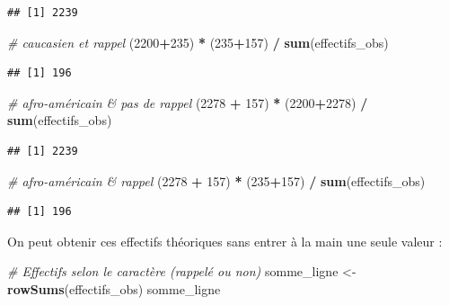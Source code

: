 \documentclass[
  11pt,
]{book}
\newenvironment{Shaded}{\begin{snugshade}}{\end{snugshade}}
\newcommand{\CommentTok}[1]{\textcolor[rgb]{0.56,0.35,0.01}{\textit{#1}}}
\newcommand{\DecValTok}[1]{\textcolor[rgb]{0.00,0.00,0.81}{#1}}
\newcommand{\FunctionTok}[1]{\textcolor[rgb]{0.13,0.29,0.53}{\textbf{#1}}}
\newcommand{\NormalTok}[1]{#1}
\newcommand{\OtherTok}[1]{\textcolor[rgb]{0.56,0.35,0.01}{#1}}
\newcommand{\SpecialCharTok}[1]{\textcolor[rgb]{0.81,0.36,0.00}{\textbf{#1}}}
\numberwithin{equation}{section}
\numberwithin{countremarque}{section}
\begin{document}
\begin{lstlisting}
## [1] 2239
\end{lstlisting}

\begin{Shaded}
\begin{Highlighting}[]
\CommentTok{\# caucasien et rappel}
\NormalTok{(}\DecValTok{2200}\SpecialCharTok{+}\DecValTok{235}\NormalTok{) }\SpecialCharTok{*}\NormalTok{ (}\DecValTok{235}\SpecialCharTok{+}\DecValTok{157}\NormalTok{) }\SpecialCharTok{/} \FunctionTok{sum}\NormalTok{(effectifs\_obs)}
\end{Highlighting}
\end{Shaded}

\begin{lstlisting}
## [1] 196
\end{lstlisting}

\begin{Shaded}
\begin{Highlighting}[]
\CommentTok{\# afro{-}américain \& pas de rappel}
\NormalTok{(}\DecValTok{2278} \SpecialCharTok{+} \DecValTok{157}\NormalTok{) }\SpecialCharTok{*}\NormalTok{ (}\DecValTok{2200}\SpecialCharTok{+}\DecValTok{2278}\NormalTok{) }\SpecialCharTok{/} \FunctionTok{sum}\NormalTok{(effectifs\_obs)}
\end{Highlighting}
\end{Shaded}

\begin{lstlisting}
## [1] 2239
\end{lstlisting}

\begin{Shaded}
\begin{Highlighting}[]
\CommentTok{\# afro{-}américain \& rappel}
\NormalTok{(}\DecValTok{2278} \SpecialCharTok{+} \DecValTok{157}\NormalTok{) }\SpecialCharTok{*}\NormalTok{ (}\DecValTok{235}\SpecialCharTok{+}\DecValTok{157}\NormalTok{) }\SpecialCharTok{/} \FunctionTok{sum}\NormalTok{(effectifs\_obs)}
\end{Highlighting}
\end{Shaded}

\begin{lstlisting}
## [1] 196
\end{lstlisting}

On peut obtenir ces effectifs théoriques sans entrer à la main une seule valeur :

\begin{Shaded}
\begin{Highlighting}[]
\CommentTok{\# Effectifs selon le caractère (rappelé ou non)}
\NormalTok{somme\_ligne }\OtherTok{\textless{}{-}} \FunctionTok{rowSums}\NormalTok{(effectifs\_obs)}
\NormalTok{somme\_ligne}
\end{Highlighting}
\end{Shaded}
\end{document}
